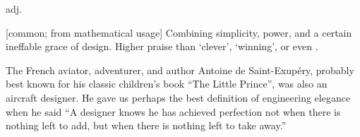  adj.

[common; from mathematical usage] Combining simplicity, power, and a certain ineffable grace of design. Higher praise than `clever',
`winning', or even .

The French aviator, adventurer, and author Antoine de Saint-Exup\'{e}ry, probably best known for his classic children's book ``The Little
Prince'', was also an aircraft designer. He gave us perhaps the best definition of engineering elegance when he said ``A designer knows he
has achieved perfection not when there is nothing left to add, but when there is nothing left to take away.''

